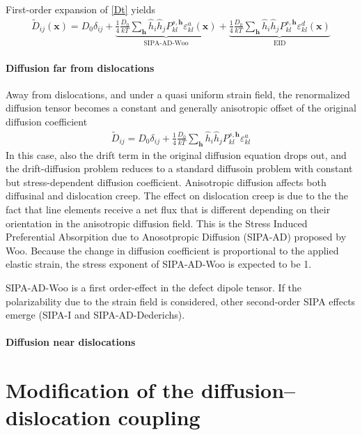 \documentclass[10pt]{article}
\begin{document}
First-order expansion of \eqref{Dt} yields
\begin{align}
\tilde{D}_{ij}(\bm x)=D_0\delta_{ij}+\underbrace{\frac{1}{4}\frac{D_0}{kT}\sum_{\bm h} \hat{h}_i\hat{h}_jP_{kl}^{s,\bm h}\varepsilon^a_{kl}(\bm x)}_{\text{SIPA-AD-Woo}}+\underbrace{\frac{1}{4}\frac{D_0}{kT}\sum_{\bm h} \hat{h}_i\hat{h}_jP_{kl}^{s,\bm h}\varepsilon^d_{kl}(\bm x)}_{\text{EID}}
\label{Dt0}
\end{align}

\paragraph{Diffusion far from dislocations}
Away from dislocations, and under a quasi uniform strain field, the renormalized diffusion tensor becomes a constant and generally anisotropic offset of the original diffusion coefficient
\begin{align}
\tilde{D}_{ij}=D_0\delta_{ij}+\frac{1}{4}\frac{D_0}{kT}\sum_{\bm h} \hat{h}_i\hat{h}_jP_{kl}^{s,\bm h}\varepsilon^a_{kl}
\end{align}
In this case, also the drift term in the original diffusion equation drops out, and the drift-diffusion problem reduces to a standard diffusoin problem with constant but stress-dependent diffusion coefficient. Anisotropic diffusion affects both diffusinal and dislocation creep. The effect on dislocation creep is due to the the fact that line elements receive a net flux that is different depending on their orientation in the anisotropic diffusion field. This is the Stress Induced Preferential Absorpition due to Anosotpropic Diffusion (SIPA-AD) proposed by Woo. Because the change in diffusion coefficient is proportional to the applied elastic strain, the stress exponent of SIPA-AD-Woo is expected to be 1.

SIPA-AD-Woo is a first order-effect in the defect dipole tensor. If the polarizability due to the strain field is considered, other second-order SIPA effects emerge (SIPA-I and SIPA-AD-Dederichs). 

 
\paragraph{Diffusion near dislocations}

\section{Modification of the diffusion--dislocation coupling}
\end{document}
